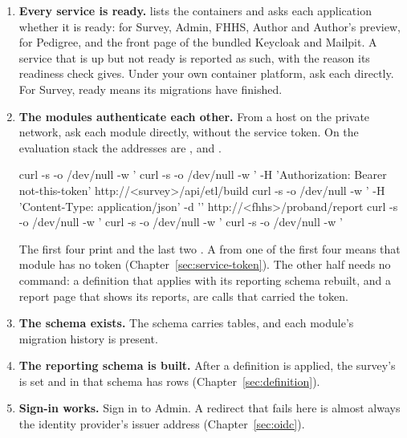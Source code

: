\documentclass[11pt, a4paper]{article}
\begin{document}
\begin{enumerate}
  \item \textbf{Every service is ready.}  lists the containers and asks each
        application whether it is ready:  for Survey, Admin, FHHS,
        Author and Author's preview,  for Pedigree, and the front page of the
        bundled Keycloak and Mailpit. A service that is up but not ready is reported as
        such, with the reason its readiness check gives. Under your own container platform,
        ask each  directly. For Survey, ready means its migrations have
        finished.
  \item \textbf{The modules authenticate each other.} From a host on the private network,
        ask each module directly, without the service token. On the evaluation stack the
        addresses are ,  and .
\begin{elicitcmd}[fontsize = \footnotesize]
curl -s -o /dev/null -w '%
curl -s -o /dev/null -w '%
     -H 'Authorization: Bearer not-this-token' http://<survey>/api/etl/build
curl -s -o /dev/null -w '%
     -H 'Content-Type: application/json' -d '{}' http://<fhhs>/proband/report
curl -s -o /dev/null -w '%
curl -s -o /dev/null -w '%
curl -s -o /dev/null -w '%
\end{elicitcmd}
        The first four print  and the last two . A  from one of
        the first four means that module has no token (Chapter~\ref{sec:service-token}). The
        other half needs no command: a definition that applies with its reporting schema
        rebuilt, and a report page that shows its reports, are calls that carried the token.
  \item \textbf{The schema exists.} The  schema carries tables, and each module's
        migration history is present.
  \item \textbf{The reporting schema is built.} After a definition is applied, the survey's
         is set and  in that schema has rows
        (Chapter~\ref{sec:definition}).
  \item \textbf{Sign-in works.} Sign in to Admin. A redirect that fails here is almost always
        the identity provider's issuer address (Chapter~\ref{sec:oidc}).

\end{enumerate}
\end{document}
